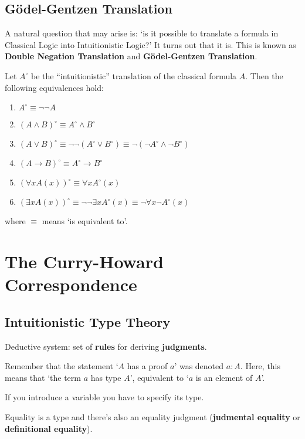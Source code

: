 \documentclass[12pt,a4paper]{article}
\theoremstyle{definition}
\begin{document}
\subsection{G{\"o}del-Gentzen Translation}
\label{Translation}

A natural question that may arise is: `is it possible to translate a formula in Classical Logic into Intuitionistic Logic?' It turns out that it is. This is known as \textbf{Double Negation Translation} and \textbf{G{\"o}del-Gentzen Translation}.

Let $A^{\circ}$ be the ``intuitionistic'' translation of the classical formula $A$. Then the following equivalences hold: 
\begin{enumerate}
\item $A^{\circ} \equiv \neg \neg A$
\item $(A \land B)^{\circ} \equiv A^{\circ} \land B^{\circ}$
\item $(A \lor B)^{\circ} \equiv \neg \neg (A^{\circ} \lor B^{\circ}) \equiv \neg(\neg A^{\circ} \land \neg B^{\circ})$
\item $(A \to B)^{\circ} \equiv A^{\circ} \to B^{\circ}$
\item $(\forall x A(x))^{\circ} \equiv \forall x A^{\circ}(x)$
\item $(\exists x A(x))^{\circ} \equiv \neg \neg \exists x A^{\circ}(x) \equiv \neg \forall x \neg A^{\circ}(x)$
\end{enumerate}
where $\equiv$ means `is equivalent to'.

\newpage
\section{The Curry-Howard Correspondence}
\label{CHC}

\subsection{Intuitionistic Type Theory}
\label{TT}

Deductive system: set of \textbf{rules} for deriving \textbf{judgments}.

Remember that the statement `$A$ has a proof $a$' was denoted $a : A$. Here, this means that `the term $a$ has type $A$', equivalent to `$a$ is an element of $A$'.

If you introduce a variable you have to specify its type.

Equality is a type and there's also an equality judgment (\textbf{judmental equality} or \textbf{definitional equality}). 
\end{document}
